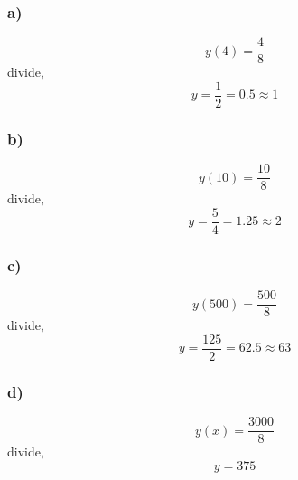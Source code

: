\documentclass[journal]{IEEEtran}
\begin{document}
        \subsubsection*{a)}
        \begin{equation}
            y(4) = \frac{4}{8}
        \end{equation}
        divide,
        \begin{equation}
            y = \frac{1}{2} = 0.5 \approx \boxed{1}
        \end{equation}

        \subsubsection*{b)}
        \begin{equation}
            y(10) = \frac{10}{8}
        \end{equation}
        divide,
        \begin{equation}
            y = \frac{5}{4} = 1.25 \approx \boxed{2}
        \end{equation}

        \subsubsection*{c)}
        \begin{equation}
            y(500) = \frac{500}{8}
        \end{equation}
        divide,
        \begin{equation}
            y = \frac{125}{2} = 62.5 \approx \boxed{63}
        \end{equation}

        \subsubsection*{d)}
        \begin{equation}
            y(x) = \frac{3000}{8}
        \end{equation}
        divide,
        \begin{equation}
            y = \boxed{375}
        \end{equation}
\end{document}
